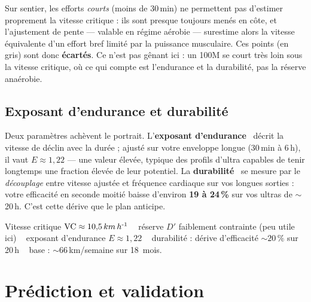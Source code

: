 \documentclass{locomotionreport}
\newcommand{\kmh}{\,km\,h\textsuperscript{-1}}
\newcommand{\VC}{\mathrm{VC}}
\begin{document}
\begin{llattention}
Sur sentier, les efforts \emph{courts} (moins de 30\,min) ne permettent pas d'estimer proprement la vitesse critique :
ils sont presque toujours men\'es en c\^ote, et l'ajustement de pente --- valable en r\'egime a\'erobie --- surestime
alors la vitesse \'equivalente d'un effort bref limit\'e par la puissance musculaire. Ces points (en gris) sont donc
\textbf{\'ecart\'es}. Ce n'est pas g\^enant ici : un 100M se court tr\`es loin sous la vitesse critique, o\`u ce qui
compte est l'endurance et la durabilit\'e, pas la r\'eserve ana\'erobie.
\end{llattention}

\subsection{Exposant d'endurance et durabilit\'e}
Deux param\`etres ach\`event le portrait. L'\textbf{exposant d'endurance}~\cite{riegel1981,drake2024} d\'ecrit la
vitesse de d\'eclin avec la dur\'ee ; ajust\'e sur votre enveloppe longue (30\,min \`a 6\,h), il vaut \(E \approx 1{,}22\)
--- une valeur \'elev\'ee, typique des profils d'ultra capables de tenir longtemps une fraction \'elev\'ee de leur
potentiel. La \textbf{durabilit\'e}~\cite{maunder2021,jones2024} se mesure par le \emph{d\'ecouplage} entre vitesse
ajust\'ee et fr\'equence cardiaque sur vos longues sorties : votre efficacit\'e en seconde moiti\'e baisse d'environ
\textbf{19 \`a 24\,\%} sur vos ultras de $\sim$20\,h. C'est cette d\'erive que le plan anticipe.

\begin{llnote}
Vitesse critique \(\VC \approx 10{,}5\kmh\) \,\textbullet\,\ r\'eserve \(D'\) faiblement contrainte (peu utile ici)
\,\textbullet\,\ exposant d'endurance \(E\approx 1{,}22\) \,\textbullet\,\ durabilit\'e : d\'erive d'efficacit\'e
\(\sim 20\,\%\) sur 20\,h \,\textbullet\,\ base : $\sim$66\,km/semaine sur 18~mois.
\end{llnote}

\section{Pr\'ediction et validation}
\label{sec:pred}
\end{document}
